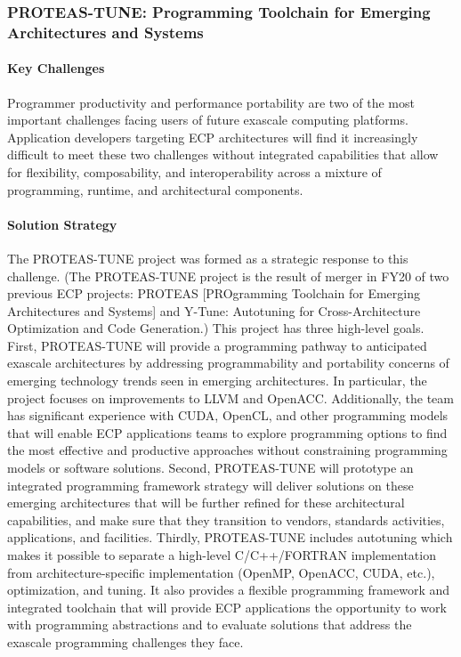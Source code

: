 \subsubsection{ PROTEAS-TUNE: Programming Toolchain for Emerging Architectures and Systems} 

\paragraph{Key  Challenges}
Programmer productivity and performance portability are two of the most important challenges facing users of future exascale computing platforms. Application developers targeting ECP architectures will find it increasingly difficult to meet these two challenges without integrated capabilities that allow for flexibility, composability, and interoperability across a mixture of programming, runtime, and architectural components. 


\paragraph{Solution Strategy}
The PROTEAS-TUNE project was formed as a strategic response to this challenge. (The PROTEAS-TUNE project is the result of merger in FY20 of two previous ECP projects: PROTEAS [PROgramming Toolchain for Emerging Architectures and Systems] and Y-Tune: Autotuning for Cross-Architecture Optimization and Code Generation.) 
This project has three high-level goals. First, PROTEAS-TUNE will provide a programming pathway to anticipated exascale architectures by addressing programmability and portability concerns of emerging technology trends seen in emerging architectures. In particular, the project focuses on improvements to LLVM and OpenACC. Additionally, the team has significant experience with CUDA, OpenCL, and other programming models that will enable ECP applications teams to explore programming options to find the most effective and productive approaches without constraining programming models or software solutions. Second, PROTEAS-TUNE will prototype an integrated programming framework strategy will deliver solutions on these emerging architectures that will be further refined for these architectural capabilities, and make sure that they transition to vendors, standards activities, applications, and facilities. Thirdly, PROTEAS-TUNE includes autotuning which makes it possible to separate a high-level C/C++/FORTRAN implementation from architecture-specific implementation (OpenMP, OpenACC, CUDA, etc.), optimization, and tuning. It also provides a flexible programming framework and integrated toolchain that will provide ECP applications the opportunity to work with programming abstractions and to evaluate solutions that address the exascale programming challenges they face. 


